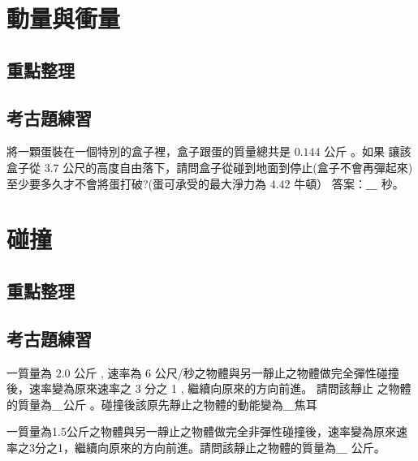 \documentclass[cn,10pt,math=newtx,chinesefont=founder]{../elegantbook}
\begin{document}
\section{動量與衝量}
\subsection{重點整理}
\newpage
\subsection{考古題練習}
\begin{example}
    將一顆蛋裝在一個特別的盒子裡，盒子跟蛋的質量總共是 $0.144$ 公斤 。如果 讓該盒子從 $3.7$ 公尺的高度自由落下，請問盒子從碰到地面到停止(盒子不會再彈起來)至少要多久才不會將蛋打破?(蛋可承受的最大淨力為 $4.42$ 牛頓） 答案：$\_\_\_$ 秒。
\end{example}
\begin{solution}
    
\end{solution}
\vspace{6cm}

\section{碰撞}
\subsection{重點整理}
\newpage
\subsection{考古題練習}

\begin{example}
    一質量為 $2.0$ 公斤 , 速率為 6 公尺/秒之物體與另一靜止之物體做完全彈性碰撞後，速率變為原來速率之 3 分之 1 , 繼續向原來的方向前進。
    請問該靜止 之物體的質量為$\_\_\_$公斤 。碰撞後該原先靜止之物體的動能變為$\_\_\_$焦耳
\end{example}
\begin{solution}
\end{solution}
\vspace{6cm}
\begin{example}
    一質量為1.5公斤之物體與另一靜止之物體做完全非彈性碰撞後，速率變為原來速率之3分之1，繼續向原來的方向前進。請問該靜止之物體的質量為$\_\_\_$ 公斤。
\end{example}
\begin{solution}
    
\end{solution}
\newpage
\end{document}
